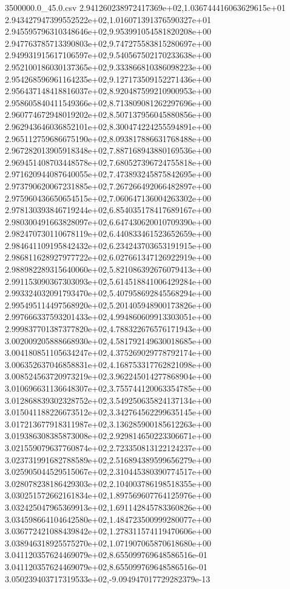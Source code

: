 \begin{filecontents*}{3500000.0_45.0.csv}
2.941260238972417369e+02,1.036744416063629615e+01
2.943427947399552522e+02,1.016071391376590327e+01
2.945595796310348646e+02,9.953991054581820208e+00
2.947763785713390803e+02,9.747275583815280697e+00
2.949931915617106597e+02,9.540567502170233638e+00
2.952100186030137365e+02,9.333866810386098223e+00
2.954268596961164235e+02,9.127173509152271436e+00
2.956437148418816037e+02,8.920487599210900953e+00
2.958605840411549366e+02,8.713809081262297696e+00
2.960774672948019202e+02,8.507137956045880856e+00
2.962943646036852101e+02,8.300474224255594891e+00
2.965112759686675190e+02,8.093817886631768488e+00
2.967282013905918348e+02,7.887168943880169536e+00
2.969451408703448578e+02,7.680527396724755818e+00
2.971620944087640055e+02,7.473893245875842695e+00
2.973790620067231885e+02,7.267266492066482897e+00
2.975960436650654515e+02,7.060647136004263302e+00
2.978130393846719244e+02,6.854035178417689167e+00
2.980300491663828097e+02,6.647430620010709390e+00
2.982470730110678119e+02,6.440833461523652659e+00
2.984641109195842432e+02,6.234243703653191915e+00
2.986811628927977722e+02,6.027661347126922919e+00
2.988982289315640060e+02,5.821086392676079413e+00
2.991153090367303093e+02,5.614518841006429284e+00
2.993324032091793470e+02,5.407958692845568294e+00
2.995495114497568920e+02,5.201405948900173826e+00
2.997666337593201433e+02,4.994860609913303051e+00
2.999837701387377820e+02,4.788322676576171943e+00
3.002009205888668930e+02,4.581792149630018685e+00
3.004180851105634247e+02,4.375269029778792174e+00
3.006352637046858831e+02,4.168753317762821098e+00
3.008524563720973219e+02,3.962245014277868904e+00
3.010696631136648307e+02,3.755744120063354785e+00
3.012868839302328752e+02,3.549250635824137134e+00
3.015041188226673512e+02,3.342764562299635145e+00
3.017213677918311987e+02,3.136285900185612263e+00
3.019386308385873008e+02,2.929814650223306671e+00
3.021559079637760874e+02,2.723350813122124237e+00
3.023731991682788589e+02,2.516894389599656279e+00
3.025905044529515067e+02,2.310445380390774517e+00
3.028078238186429303e+02,2.104003786198518355e+00
3.030251572662161834e+02,1.897569607764125976e+00
3.032425047965369913e+02,1.691142845783360826e+00
3.034598664104642580e+02,1.484723500999280077e+00
3.036772421088439842e+02,1.278311574119470606e+00
3.038946318925575270e+02,1.071907065870618680e+00
3.041120357624469079e+02,8.655099769648586516e-01
3.041120357624469079e+02,8.655099769648586516e-01
3.050239403717319533e+02,-9.094947017729282379e-13
\end{filecontents*}

